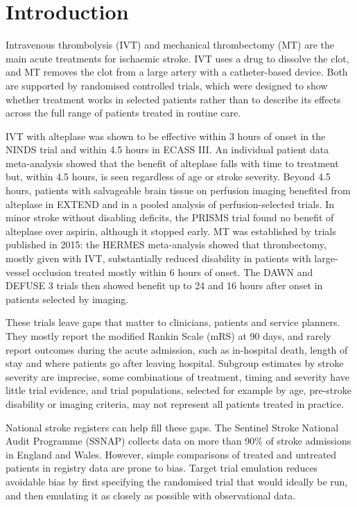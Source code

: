 \section{Introduction}

Intravenous thrombolysis (IVT) and mechanical thrombectomy (MT) are the main acute treatments for ischaemic stroke. IVT uses a drug to dissolve the clot, and MT removes the clot from a large artery with a catheter-based device. Both are supported by randomised controlled trials, which were designed to show whether treatment works in selected patients rather than to describe its effects across the full range of patients treated in routine care.

IVT with alteplase was shown to be effective within 3 hours of onset in the NINDS trial\cite{ninds_tissue_1995} and within 4.5 hours in ECASS III\cite{hacke_thrombolysis_2008}. An individual patient data meta-analysis showed that the benefit of alteplase falls with time to treatment but, within 4.5 hours, is seen regardless of age or stroke severity\cite{emberson_effect_2014}. Beyond 4.5 hours, patients with salvageable brain tissue on perfusion imaging benefited from alteplase in EXTEND\cite{ma_thrombolysis_2019} and in a pooled analysis of perfusion-selected trials\cite{campbell_extending_2019}. In minor stroke without disabling deficits, the PRISMS trial found no benefit of alteplase over aspirin, although it stopped early\cite{khatri_effect_2018}. MT was established by trials published in 2015: the HERMES meta-analysis showed that thrombectomy, mostly given with IVT, substantially reduced disability in patients with large-vessel occlusion treated mostly within 6 hours of onset\cite{goyal_endovascular_2016}. The DAWN and DEFUSE 3 trials then showed benefit up to 24 and 16 hours after onset in patients selected by imaging\cite{nogueira_thrombectomy_2018, albers_thrombectomy_2018}.

These trials leave gaps that matter to clinicians, patients and service planners. They mostly report the modified Rankin Scale (mRS) at 90 days, and rarely report outcomes during the acute admission, such as in-hospital death, length of stay and where patients go after leaving hospital. Subgroup estimates by stroke severity are imprecise, some combinations of treatment, timing and severity have little trial evidence, and trial populations, selected for example by age, pre-stroke disability or imaging criteria, may not represent all patients treated in practice.

National stroke registers can help fill these gaps. The Sentinel Stroke National Audit Programme (SSNAP) collects data on more than 90\% of stroke admissions in England and Wales\cite{ssnap_website}. However, simple comparisons of treated and untreated patients in registry data are prone to bias. Target trial emulation reduces avoidable bias by first specifying the randomised trial that would ideally be run, and then emulating it as closely as possible with observational data\cite{hernan_using_2016, hernan_target_2022}.

